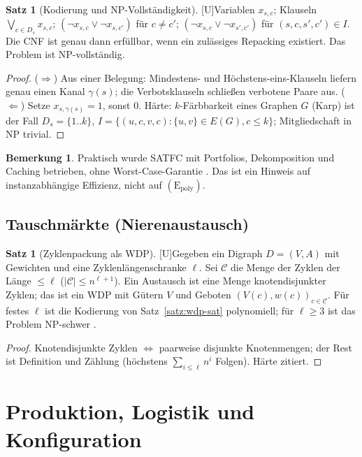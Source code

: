 \documentclass[a4paper,12pt]{article}
\theoremstyle{definition}
\newtheorem{satz}[definition]{Satz}
\newtheorem{bemerkung}[definition]{Bemerkung}
\newcommand{\tU}{\textsf{\small[U]}}   %
\newcommand{\cNP}{\ensuremath{\mathrm{NP}}}
\newcommand{\Epoly}{(\mathrm{E}_{\mathrm{poly}})}
\begin{document}
\begin{satz}[Kodierung und NP-Vollständigkeit]\tU\label{satz:repack}
Variablen \(x_{s,c}\); Klauseln \(\bigvee_{c\in D_s}x_{s,c}\); \((\neg x_{s,c}\vee\neg x_{s,c'})\) für \(c\ne c'\); \((\neg x_{s,c}\vee\neg x_{s',c'})\) für \((s,c,s',c')\in I\). Die CNF ist genau dann erfüllbar, wenn ein zulässiges Repacking existiert. Das Problem ist \(\cNP\)-vollständig.
\end{satz}
\begin{proof}
(\(\Rightarrow\)) Aus einer Belegung: Mindestens- und Höchstens-eins-Klauseln liefern genau einen Kanal \(\gamma(s)\); die Verbotsklauseln schließen verbotene Paare aus. (\(\Leftarrow\)) Setze \(x_{s,\gamma(s)}=1\), sonst 0. Härte: \(k\)-Färbbarkeit eines Graphen \(G\) (Karp) ist der Fall \(D_s=\{1..k\}\), \(I=\{(u,c,v,c):\{u,v\}\in E(G),c\le k\}\); Mitgliedschaft in \(\cNP\) trivial.
\end{proof}
\begin{bemerkung}
Praktisch wurde SATFC mit Portfolios, Dekomposition und Caching betrieben, ohne Worst-Case-Garantie \cite{frechette2016,newman2018}. Das ist ein Hinweis auf instanzabhängige Effizienz, nicht auf \(\Epoly\).
\end{bemerkung}

\subsection{Tauschmärkte (Nierenaustausch)}
\begin{satz}[Zyklenpackung als WDP]\tU\label{satz:kidney}
Gegeben ein Digraph \(D=(V,A)\) mit Gewichten und eine Zyklenlängenschranke \(\ell\). Sei \(\mathcal C\) die Menge der Zyklen der Länge \(\le\ell\) (\(|\mathcal C|\le n^{\ell+1}\)). Ein Austausch ist eine Menge knotendisjunkter Zyklen; das ist ein WDP mit Gütern \(V\) und Geboten \((V(c),w(c))_{c\in\mathcal C}\). Für festes \(\ell\) ist die Kodierung von Satz~\ref{satz:wdp-sat} polynomiell; für \(\ell\ge3\) ist das Problem \(\cNP\)-schwer \cite{abraham2007}.
\end{satz}
\begin{proof}
Knotendisjunkte Zyklen \(\Leftrightarrow\) paarweise disjunkte Knotenmengen; der Rest ist Definition und Zählung (höchstens \(\sum_{i\le\ell}n^i\) Folgen). Härte zitiert.
\end{proof}

\section{Produktion, Logistik und Konfiguration}
\label{eco:production}
\end{document}
